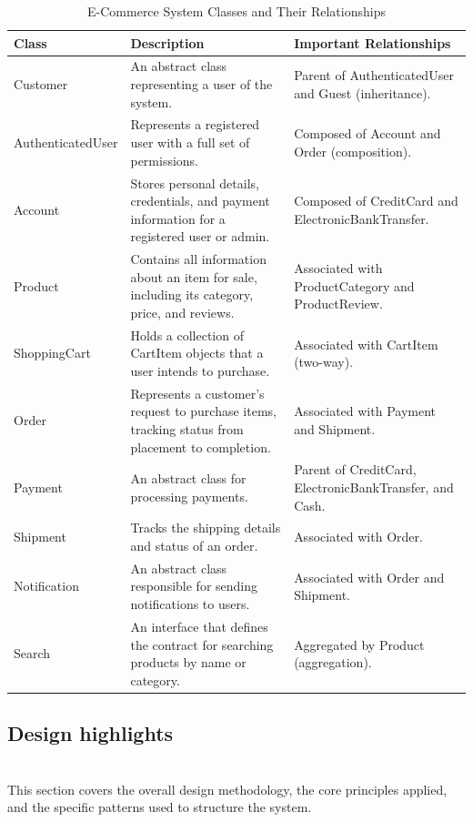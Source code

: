 \begin{table}[h!]
\centering
\begin{tabular}{|p{3.8cm}|p{6.8cm}|p{5.8cm}|}
\hline
\textbf{Class} & \textbf{Description} & \textbf{Important Relationships} \\
\hline
Customer & An abstract class representing a user of the system. & Parent of AuthenticatedUser and Guest (inheritance). \\
\hline
AuthenticatedUser & Represents a registered user with a full set of permissions. & Composed of Account and Order (composition). \\
\hline
Account & Stores personal details, credentials, and payment information for a registered user or admin. & Composed of CreditCard and ElectronicBankTransfer. \\
\hline
Product & Contains all information about an item for sale, including its category, price, and reviews. & Associated with ProductCategory and ProductReview. \\
\hline
ShoppingCart & Holds a collection of CartItem objects that a user intends to purchase. & Associated with CartItem (two-way). \\
\hline
Order & Represents a customer’s request to purchase items, tracking status from placement to completion. & Associated with Payment and Shipment. \\
\hline
Payment & An abstract class for processing payments. & Parent of CreditCard, ElectronicBankTransfer, and Cash. \\
\hline
Shipment & Tracks the shipping details and status of an order. & Associated with Order. \\
\hline
Notification & An abstract class responsible for sending notifications to users. & Associated with Order and Shipment. \\
\hline
Search & An interface that defines the contract for searching products by name or category. & Aggregated by Product (aggregation). \\
\hline
\end{tabular}
\caption{E-Commerce System Classes and Their Relationships}
\label{tab:ecommerce_classes}
\end{table}


\subsection{Design highlights}\label{4yZ-MXZNs_zxGjUCEZvVS}
\\
This section covers the overall design methodology, the core principles applied, and the specific patterns used to structure the system.

